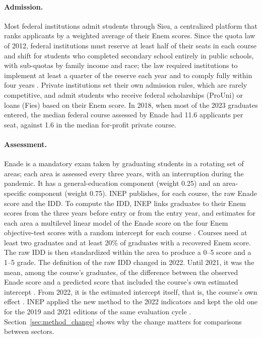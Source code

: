 \documentclass[11pt,a4paper]{article}
\begin{document}
\paragraph{Admission.} Most federal institutions admit students through Sisu, a centralized platform that ranks applicants by a weighted average of their Enem scores. Since the quota law of 2012, federal institutions must reserve at least half of their seats in each course and shift for students who completed secondary school entirely in public schools, with sub-quotas by family income and race; the law required institutions to implement at least a quarter of the reserve each year and to comply fully within four years \citep[arts.~1 and~8]{lei12711}. Private institutions set their own admission rules, which are rarely competitive, and admit students who receive federal scholarships (ProUni) or loans (Fies) based on their Enem score. In 2018, when most of the 2023 graduates entered, the median federal course assessed by Enade had 11.6 applicants per seat, against 1.6 in the median for-profit private course.

\paragraph{Assessment.} Enade is a mandatory exam taken by graduating students in a rotating set of areas; each area is assessed every three years, with an interruption during the pandemic. It has a general-education component (weight 0.25) and an area-specific component (weight 0.75). INEP publishes, for each course, the raw Enade score and the IDD. To compute the IDD, INEP links graduates to their Enem scores from the three years before entry or from the entry year, and estimates for each area a multilevel linear model of the Enade score on the four Enem objective-test scores with a random intercept for each course \citep{inep2022idd,inep2023idd}. Courses need at least two graduates and at least 20\% of graduates with a recovered Enem score. The raw IDD is then standardized within the area to produce a 0--5 score and a 1--5 grade. The definition of the raw IDD changed in 2022. Until 2021, it was the mean, among the course's graduates, of the difference between the observed Enade score and a predicted score that included the course's own estimated intercept \citep{inep2020idd,inep2022idd,terhaar2021}. From 2022, it is the estimated intercept itself, that is, the course's own effect \citep{inep2023idd}. INEP applied the new method to the 2022 indicators and kept the old one for the 2019 and 2021 editions of the same evaluation cycle \citep{inep2024igc}. Section~\ref{sec:method_change} shows why the change matters for comparisons between sectors.
\end{document}
